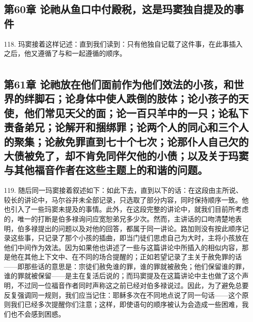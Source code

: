 
\subsection{第60章 论祂从鱼口中付殿税，这是玛窦独自提及的事件}

118. 玛窦接着这样记述：直到我们读到：只有他独自记载了这件事，在此事插入之后，他又遵循了与和一起遵循的顺序。\par



\section{}


\subsection{第61章 论祂放在他们面前作为他们效法的小孩，和世界的绊脚石；论身体中使人跌倒的肢体；论小孩子的天使，他们常见天父的面；论一百只羊中的一只；论私下责备弟兄；论解开和捆绑罪；论两个人的同心和三个人的聚集；论赦免罪直到七十个七次；论那仆人自己欠的大债被免了，却不肯免同伴欠他的小债；以及关于玛窦与其他福音作者在这些主题上的和谐的问题。}

119. 随后同一玛窦接着叙述如下：如此下去，直到以下的话：在这段由主所说、较长的讲论中，马尔谷并未全部记录，只选取了部分内容，同时保持顺序一致。他也引入了一些玛窦未提及的事情。此外，在这段完整的讲论中，就我们目前所考虑的，唯一的打断是伯多禄询问应宽恕弟兄多少次。然而，主讲话的口吻清楚地表明，伯多禄提出的问题以及对他的回答，都属于同一讲论。路加则没有按此顺序记录这些事，只记录了那个小孩的插曲，即当门徒们思虑自己为大时，主将小孩放在他们中间作为效法。因为如果他也讲述了一些与这篇讲论中所插入的相似内容，那是他在其他上下文中、在不同的场合提醒的；正如若望记录了主关于赦免罪的话——即那些话的意思是：宗徒们赦免谁的罪，谁的罪就被赦免；他们保留谁的罪，谁的罪就被保留——是主在复活后说的；而玛窦提及在这篇讲论中主也做了这个声明，不过同一位福音作者同时声称这之前已经对伯多禄说过。因此，为了避免总要反复强调同一规则，我们应当记住：耶稣多次在不同地点说了同一句话——这个原则我们已经多次提醒你们注意；这样，即使语句的顺序被认为会造成一些困难，我们也不会感到困惑。\par

